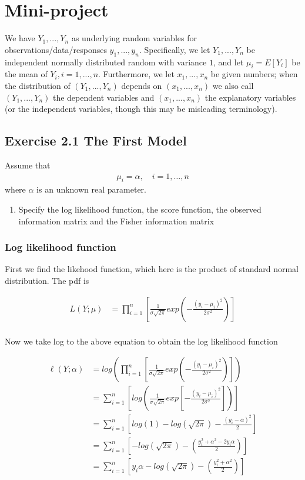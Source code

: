 \newpage
\section*{Mini-project}
We have $Y_1,...,Y_n$ as underlying random variables for observations/data/responses $y_1,...,y_n$.
Specifically, we let $Y_1,...,Y_n$ be independent normally distributed random with variance $1$, and let $\mu_i= E[Y_i]$ be the mean of $Y_i, i= 1,...,n$.
Furthermore, we let $x_1,...,x_n$ be given numbers; when the distribution of $(Y_1,...,Y_n)$ depends on $(x_1,...,x_n)$ we also call $(Y_1,...,Y_n)$ the dependent variables and $(x_1,...,x_n)$ the explanatory variables (or the independent variables, though this may be misleading terminology).

\subsection*{Exercise 2.1 The First Model}

Assume that
\begin{align*}
    \mu_i = \alpha, \quad i = 1, \ldots,n
\end{align*}
where $\alpha$ is an unknown real parameter. 

\begin{enumerate}
    \item Specify the log likelihood function, the score function, the observed information matrix and the Fisher information matrix
\end{enumerate}

\subsubsection{Log likelihood function}
First we find the likehood function, which here is the product of standard normal distribution. The pdf is 

\begin{align*}
   L(Y;\mu) &= \prod_{i=1}^n \left[ \frac{1}{\sigma \sqrt{2 \pi}}exp\left(-\frac{(y_i -\mu_i)^2}{2 \sigma^2}\right) \right]\\
\end{align*}

Now we take log to the above equation to obtain the log likelihood function

\begin{align*}
   \ell(Y;\alpha) &= log \left( \prod_{i=1}^n \left[ \frac{1}{\sigma \sqrt{2 \pi}}exp\left(-\frac{(y_i -\mu_i)^2}{2 \sigma^2}\right) \right] \right)\\
   &= \sum_{i = 1}^n \left[ log\left( \frac{1}{\sigma \sqrt{2 \pi}}exp\left[-\frac{(y_i - \mu_i)^2}{2 \sigma^2}\right] \right) \right]\\
   &= \sum_{i = 1}^n \left[ log(1) - log(\sqrt{2 \pi}) - \frac{(y_i - \alpha)^2}{2} \right]\\
   &= \sum_{i = 1}^n \left[- log\left( \sqrt{2 \pi}\right) - \left(\frac{y_i^2 + \alpha^2 - 2y_i\alpha}{2}\right) \right]\\
   &= \sum_{i = 1}^n \left[y_i \alpha - log\left( \sqrt{2 \pi}\right) - \left( \frac{y_i^2 + \alpha^2}{2} \right) \right]
\end{align*}

